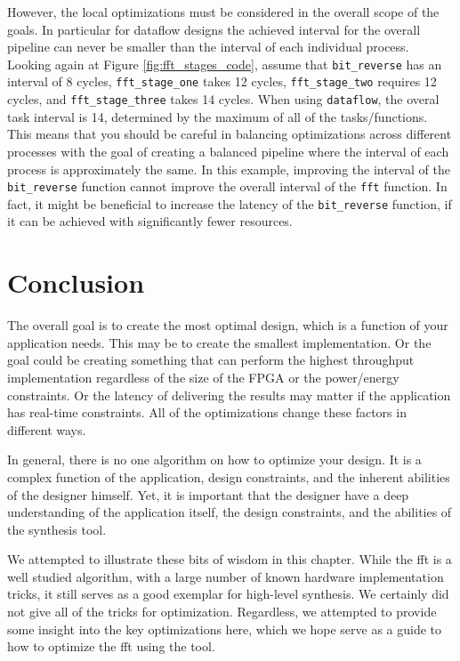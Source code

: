 However, the local optimizations must be considered in the overall scope of the goals. In particular for dataflow designs the achieved interval for the overall pipeline can never be smaller than the interval of each individual process. Looking again at Figure \ref{fig:fft_stages_code}, assume that \lstinline{bit_reverse} has an interval of 8 cycles, \lstinline{fft_stage_one} takes 12 cycles, \lstinline{fft_stage_two} requires 12 cycles, and \lstinline{fft_stage_three} takes 14 cycles. When using \lstinline{dataflow}, the overal task interval is 14, determined by the maximum of all of the tasks/functions. This means that you should be careful in balancing optimizations across different processes with the goal of creating a balanced pipeline where the interval of each process is approximately the same. In this example, improving the interval of the \lstinline{bit_reverse} function cannot improve the overall interval of the \lstinline|fft| function. In fact, it might be beneficial to increase the latency of the \lstinline{bit_reverse} function, if it can be achieved with significantly fewer resources.

\section{Conclusion}
\label{sec:fft_conclusion}

The overall goal is to create the most optimal design, which is a function of your application needs. This may be to create the smallest implementation. Or the goal could be creating something that can perform the highest throughput implementation regardless of the size of the FPGA or the power/energy constraints. Or the latency of delivering the results may matter if the application has real-time constraints. All of the optimizations change these factors in different ways. 

In general, there is no one algorithm on how to optimize your design. It is a complex function of the application, design constraints, and the inherent abilities of the designer himself. Yet, it is important that the designer have a deep understanding of the application itself, the design constraints, and the abilities of the synthesis tool. 

We attempted to illustrate these bits of wisdom in this chapter. While the \gls{fft} is a well studied algorithm, with a large number of known hardware implementation tricks, it still serves as a good exemplar for high-level synthesis. We certainly did not give all of the tricks for optimization. %
Regardless, we attempted to provide some insight into the key optimizations here, which we hope serve as a guide to how to optimize the \gls{fft} using the \VHLS tool.

